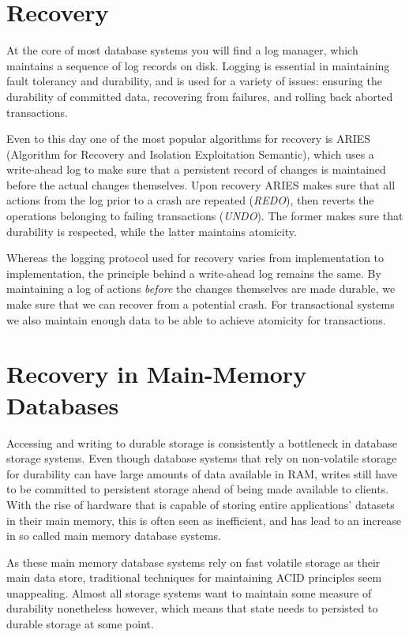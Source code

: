 \documentclass[b5paper]{report}
\begin{document}
\section{Recovery} \label{aries}
At the core of most database systems you will find a log manager, which
maintains a sequence of log records on disk. Logging is essential in maintaining
fault tolerancy and durability, and is used for a variety of issues: ensuring
the durability of committed data, recovering from failures, and rolling back
aborted transactions.

Even to this day one of the most popular algorithms for recovery is ARIES
\cite{aries} (Algorithm for Recovery and Isolation Exploitation Semantic), which
uses a write-ahead log to make sure that a persistent record of changes is
maintained before the actual changes themselves. Upon recovery ARIES makes sure
that all actions from the log prior to a crash are repeated (\textit{REDO}),
then reverts the operations belonging to failing transactions (\textit{UNDO}).
The former makes sure that durability is respected, while the latter maintains
atomicity.

Whereas the logging protocol used for recovery varies from implementation to
implementation, the principle behind a write-ahead log remains the same. By
maintaining a log of actions \textit{before} the changes themselves are made
durable, we make sure that we can recover from a potential crash. For
transactional systems we also maintain enough data to be able to achieve
atomicity for transactions.

\section{Recovery in Main-Memory Databases}
Accessing and writing to durable storage is consistently a bottleneck in
database storage systems. Even though database systems that rely on non-volatile
storage for durability can have large amounts of data available in RAM, writes
still have to be committed to persistent storage ahead of being made available
to clients. With the rise of hardware that is capable of storing entire
applications' datasets in their main memory, this is often seen as inefficient,
and has lead to an increase in so called main memory database systems.

As these main memory database systems rely on fast volatile storage as their
main data store, traditional techniques for maintaining ACID principles seem
unappealing. Almost all storage systems want to maintain some measure of
durability nonetheless however, which means that state needs to persisted to
durable storage at some point.
\end{document}
